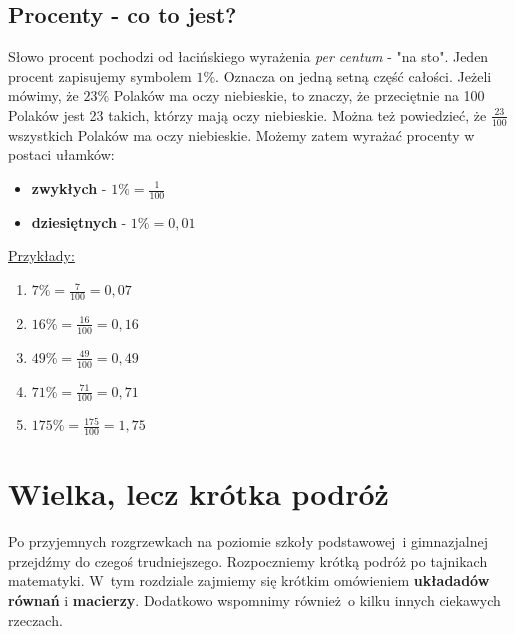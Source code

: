 \documentclass[12pt, a4paper]{article}
\begin{document}
\subsection{Procenty - co to jest?} 
\label{subsubsec:Procenty}
Słowo procent pochodzi od łacińskiego wyrażenia \emph{per centum} - "na sto".
Jeden procent zapisujemy symbolem $1\%$. Oznacza on jedną setną część całości.
Jeżeli mówimy, że $23\%$ Polaków ma oczy niebieskie, to znaczy, że przeciętnie na 100 Polaków jest 23 takich, którzy mają oczy niebieskie. Można też powiedzieć, że $\frac{23}{100}$ wszystkich Polaków ma oczy niebieskie.\newline
Możemy zatem wyrażać procenty w postaci ułamków:
\begin{itemize}
	\item \textbf{zwykłych} - $1\%=\frac{1}{100}$
	\item \textbf{dziesiętnych} - $1\%=0,01$
\end{itemize}
\underline{Przykłady:}
\begin{enumerate}
		\item $7\%=\frac{7}{100}=0,07$
		\item $16\%=\frac{16}{100}=0,16$
		\item $49\%=\frac{49}{100}=0,49$
		\item $71\%=\frac{71}{100}=0,71$
		\item $175\%=\frac{175}{100}=1,75$
	\end{enumerate}\cite{matemaks} 
\newpage
\section{Wielka, lecz krótka podróż}
\label{sec:Wielka}
Po przyjemnych rozgrzewkach na poziomie szkoły podstawowej~i gimnazjalnej przejdźmy do czegoś trudniejszego. Rozpoczniemy krótką podróż po tajnikach matematyki. W~tym rozdziale zajmiemy się krótkim omówieniem \textbf{układadów równań} i \textbf{macierzy}. Dodatkowo wspomnimy również~o kilku innych ciekawych rzeczach.
\end{document}
